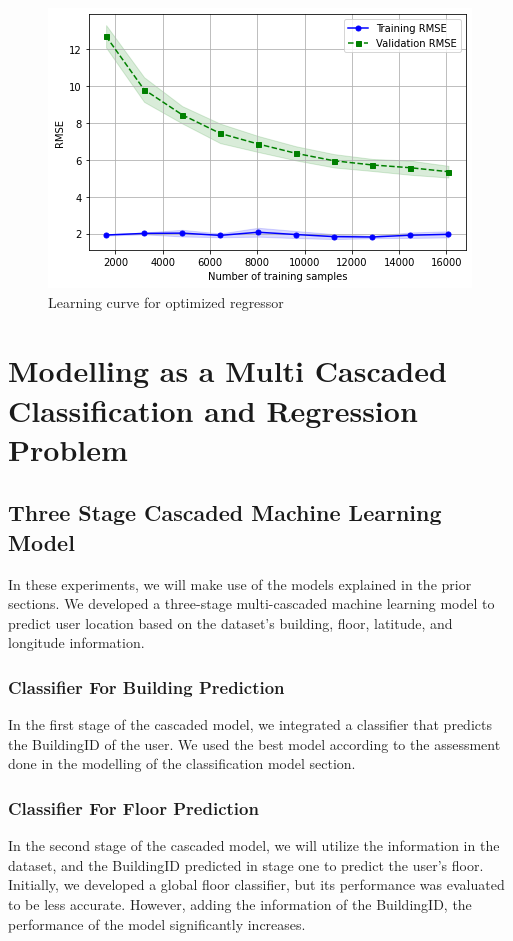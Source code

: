 \documentclass[a4paper,singleside,12pt]{report} %
\begin{document}
				\begin{figure}[h!]
					\centering
					\includegraphics[width=0.8\linewidth]{./figures/learning_curve.png}
					\caption{Learning curve for optimized regressor}
					 \label{fig4.11}
				\end{figure}

\newpage


		\section{Modelling as a Multi Cascaded Classification and Regression Problem}
			\subsection{Three Stage Cascaded Machine Learning Model}

			In these experiments, we will make use of the models explained in the prior sections. 
			We developed a three-stage multi-cascaded machine learning model to predict user location based on the dataset's building, floor, latitude, and longitude information. 

				\subsubsection{Classifier For Building Prediction}

					In the first stage of the cascaded model, we integrated a classifier that predicts the BuildingID of the user. 
					We used the best model according to the assessment done in the modelling of the classification model section.

				\subsubsection{Classifier For Floor Prediction}
					In the second stage of the cascaded model, we will utilize the information in the dataset, and the BuildingID predicted in stage one to predict the user's floor. 
					Initially, we developed a global floor classifier, but its performance was evaluated to be less accurate. 
					However, adding the information of the BuildingID, the performance of the model significantly increases.
\end{document}

